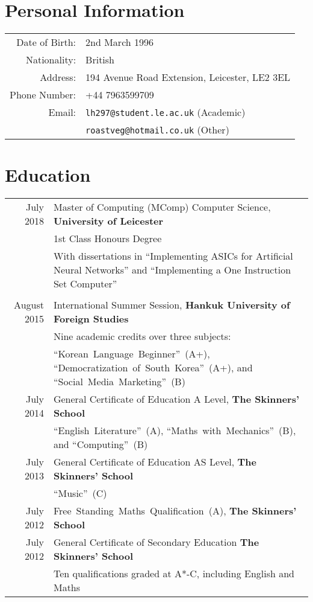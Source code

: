 \documentclass[a4paper]{article}
\begin{document}
\pagestyle{empty}
\par{ \par}

\section*{Personal Information}
\begin{tabular}{rl}
  Date of Birth: & 2nd March 1996 \\
  Nationality: & British \\
  Address: & 194 Avenue Road Extension, Leicester, LE2 3EL \\
  Phone Number: & +44 7963599709 \\
  Email: & \texttt{lh297@student.le.ac.uk} (Academic) \\
  & \texttt{roastveg@hotmail.co.uk} (Other)
\end{tabular}

\section*{Education}
\begin{tabular}{rp{11.75cm}}
  July 2018 & Master of Computing (MComp) Computer Science, \textbf{University of Leicester} \\
  & 1st Class Honours Degree \\
  & With dissertations in ``Implementing ASICs for Artificial Neural Networks'' and ``Implementing a One Instruction Set Computer'' \\
  \multicolumn{2}{c}{} \\
  
  August 2015 & International Summer Session, \textbf{Hankuk University of Foreign Studies} \\
  & Nine academic credits over three subjects: \\
  & ``Korean~Language~Beginner''~(A+), ``Democratization~of~South~Korea''~(A+), and ``Social~Media~Marketing''~(B) \\
  
  July 2014 & General Certificate of Education A Level, \textbf{The Skinners' School} \\
  & ``English~Literature''~(A), ``Maths~with~Mechanics''~(B), and ``Computing''~(B) \\
  July 2013 & General Certificate of Education AS Level, \textbf{The Skinners' School} \\
  & ``Music''~(C) \\
  July 2012 & Free~Standing~Maths~Qualification~(A), \textbf{The Skinners' School} \\
  July 2012 & General Certificate of Secondary Education \textbf{The Skinners' School} \\
  & Ten qualifications graded at A*-C, including English and Maths
\end{tabular}
\end{document}
